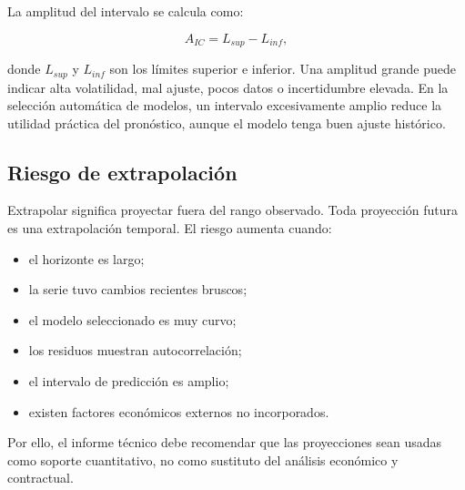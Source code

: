 La amplitud del intervalo se calcula como:

\begin{equation}
    A_{IC} = L_{sup} - L_{inf},
    \label{eq:amplitud_ic}
\end{equation}

donde \(L_{sup}\) y \(L_{inf}\) son los límites superior e inferior. Una amplitud grande puede indicar alta volatilidad, mal ajuste, pocos datos o incertidumbre elevada. En la selección automática de modelos, un intervalo excesivamente amplio reduce la utilidad práctica del pronóstico, aunque el modelo tenga buen ajuste histórico.

\subsection{Riesgo de extrapolación}

Extrapolar significa proyectar fuera del rango observado. Toda proyección futura es una extrapolación temporal. El riesgo aumenta cuando:

\begin{itemize}
    \item el horizonte es largo;
    \item la serie tuvo cambios recientes bruscos;
    \item el modelo seleccionado es muy curvo;
    \item los residuos muestran autocorrelación;
    \item el intervalo de predicción es amplio;
    \item existen factores económicos externos no incorporados.
\end{itemize}

Por ello, el informe técnico debe recomendar que las proyecciones sean usadas como soporte cuantitativo, no como sustituto del análisis económico y contractual.
